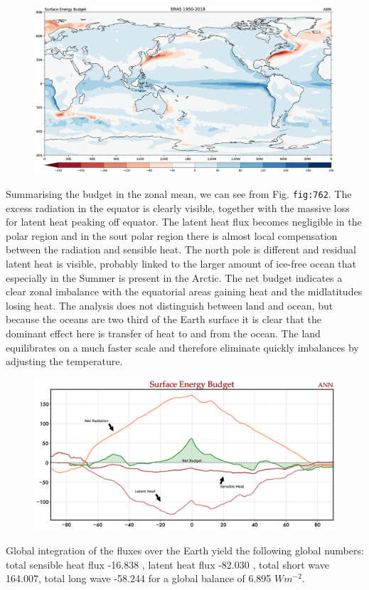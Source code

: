 \begin{figure}
\centering
\includegraphics[width = .7 \textwidth]{figs/GD/SrfBudgetANN.png}
\caption{} \label{fig:}
\end{figure}

Summarising the budget in the zonal mean, we can see from Fig.
\texttt{fig:762}. The excess radiation in the equator is clearly
visible, together with the massive loss for latent heat peaking off
equator. The latent heat flux becomes negligible in the polar region and
in the sout polar region there is almost local compensation between the
radiation and sensible heat. The north pole is different and residual
latent heat is visible, probably linked to the larger amount of ice-free
ocean that especially in the Summer is present in the Arctic. The net
budget indicates a clear zonal imbalance with the equatorial areas
gaining heat and the midlatitudes losing heat. The analysis does not
distinguish between land and ocean, but because the oceans are two third
of the Earth surface it is clear that the dominant effect here is
transfer of heat to and from the ocean. The land equilibrates on a much
faster scale and therefore eliminate quickly imbalances by adjusting the
temperature.

\begin{figure}
\centering
\includegraphics[width = .7 \textwidth]{figs/GD/SrfBudProfileANN.png}
\caption{} \label{fig:}
\end{figure}

Global integration of the fluxes over the Earth yield the following
global numbers: total sensible heat flux -16.838 , latent heat flux
-82.030 , total short wave 164.007, total long wave -58.244 for a global
balance of 6.895 \(W m^{-2}\).

